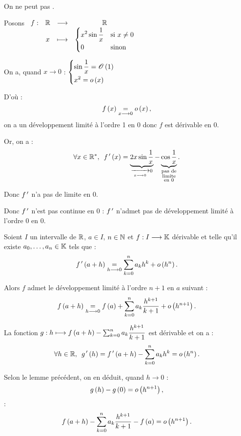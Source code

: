 \begin{rem}
On ne peut pas .
\end{rem}

\begin{dem}
Posons \(\begin{array}[t]{cccc}f : & \mathbb{R} & \longrightarrow & \mathbb{R} \\ & x & \longmapsto & \begin{dcases}x^2\sin\dfrac{1}{x} &\text{si }x\not=0 \\ 0 &\text{sinon}\end{dcases}\end{array}\)

On a, quand \(x\to0\) : \(\begin{dcases}
\sin\dfrac{1}{x}=\mathscr{O}\left(1\right) \\
x^2=o\left(x\right)
\end{dcases}\)

D'où : \[f\left(x\right)\underset{x\longrightarrow0}{=}o\left(x\right),\] on a un développement limité à l'ordre 1 en \(0\) donc \(f\) est dérivable en \(0\).

Or, on a : \[\quantifs{\forall x\in\Rs}f\prim\paren{x}=\underbrace{2x\sin\dfrac{1}{x}}_{\xrightarrow[x\to0]{}0}-\underbrace{\cos\dfrac{1}{x}}_{\substack{\text{pas de} \\ \text{limite} \\ \text{en }0}}.\]

Donc \(f^{\,\prime}\) n'a pas de limite en \(0\).

Donc \(f^{\,\prime}\) n'est pas continue en \(0\) : \(f^{\,\prime}\) n'admet pas de développement limité à l'ordre 0 en \(0\).
\end{dem}

\begin{prop}
Soient \(I\) un intervalle de \(\mathbb{R}\), \(a\in I\), \(n\in\mathbb{N}\) et \(f:I\longrightarrow\mathbb{K}\) dérivable et telle qu'il existe \(a_0,\dots,a_n\in\mathbb{K}\) tels que : \[f^{\,\prime}\left(a+h\right)\underset{h\longrightarrow0}{=}\sum_{k=0}^na_kh^k+o\left(h^n\right).\]

Alors \(f\) admet le développement limité à l'ordre \(n+1\) en \(a\) suivant : \[f\left(a+h\right)\underset{h\longrightarrow0}{=}f\left(a\right)+\sum_{k=0}^na_k\dfrac{h^{k+1}}{k+1}+o\left(h^{n+1}\right).\]
\end{prop}

\begin{dem}
La fonction \(g:h\longmapsto f\left(a+h\right)-\sum_{k=0}^na_k\dfrac{h^{k+1}}{k+1}\) est dérivable et on a : \[\quantifs{\forall h\in\R}g\prim\paren{h}=f\prim\paren{a+h}-\sum_{k=0}^na_kh^k=\o{h^n}.\]

Selon le lemme précédent, on en déduit, quand \(h\to0\) : \[g\left(h\right)-g\left(0\right)=o\left(h^{n+1}\right),\] \cad : \[f\left(a+h\right)-\sum_{k=0}^na_k\dfrac{h^{k+1}}{k+1}-f\left(a\right)=o\left(h^{n+1}\right).\]
\end{dem}

